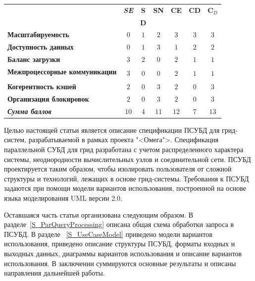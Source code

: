 \documentclass[11pt,oneside]{article}
\begin{document}
	\begin{table}[h!]
		\begin{tabular}{|l|c|c|c|c|c|c|}
			\hline
			& \textit{\textbf{SE}} & \textbf{S} & \textbf{SN} & \textbf{CE} & \textbf{CD} & \textbf{C}$_D$ \\
			& & \textbf{D} & & & & \\
			\hline
			\textbf{Масштабируемость} & $0$ & $1$ & $2$ & $3$ & $3$ & $3$ \\
			\hline
			\textbf{Доступность данных} & $0$ & $1$ & $3$ & $1$ & $2$ & $2$ \\
			\hline
			\textbf{Баланс загрузки} & $3$ & $2$ & $0$ & $2$ & $1$ & $1$ \\
			\hline
			\textbf{Межпроцессорные коммуникации} & \multirow{2}{*}{$3$} & \multirow{2}{*}{$0$} & \multirow{2}{*}{$0$} & \multirow{2}{*}{$2$} & \multirow{2}{*}{$1$} & \multirow{2}{*}{$1$} \\
			& & & & & & \\
			\hline
			\textbf{Когерентность кэшей} & $2$ & $0$ & $3$ & $2$ & $0$ & $3$ \\
			\hline
			\textbf{Организация блокировок} & $2$ & $0$ & $3$ & $2$ & $0$ & $3$ \\
			\hline
			\textit{\textbf{Сумма баллов}} & $10$ & $4$ & $11$ & $12$ & $7$ & $13$ \\
			\hline
		\end{tabular}
		\label{t}
	\end{table}
	
	\par Целью настоящей статьи является описание спецификации ПСУБД для грид-систем, разрабатываемой в рамках проекта "<Омега">\cite{B_OMEGA}. Спецификация параллельной СУБД для грид разработана с учетом распределенного характера системы, неоднородности вычислительных узлов и соединительной сети. ПСУБД проектируется таким образом, чтобы изолировать пользователя от сложной структуры и технологий, лежащих в основе грид-системы. Требования к ПСУБД задаются при помощи модели вариантов использования, построенной на основе языка моделирования UML версии 2.0.
	\par Оставшаяся часть статьи организована следующим образом. В разделе~\ref{S_ParQueryProcessing} описана общая схема обработки запроса в ПСУБД. В разделе ~\ref{S_UseCaseModel} приведено модели вариантов использования, приведено описание структуры ПСУБД, форматы входных и выходных данных, диаграммы вариантов использования и описание вариантов использования. В заключении суммируются основные результаты и описаны направления дальнейшей работы.
	
\end{document}
